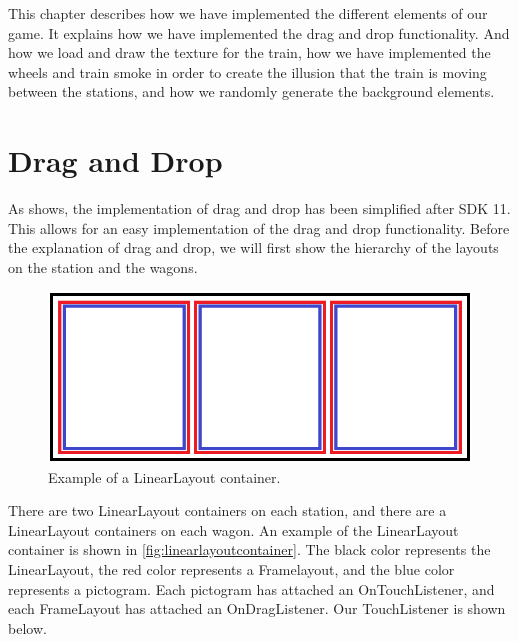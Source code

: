This chapter describes how we have implemented the different elements of our game. It explains how we have implemented the drag and drop functionality. And how we load and draw the texture for the train, how we have implemented the wheels and train smoke in order to create the illusion that the train is moving between the stations, and how we randomly generate the background elements.

\section{Drag and Drop}
\label{sec:implementationdraganddrop}
As  shows, the implementation of drag and drop has been simplified after SDK 11. This allows for an easy implementation of the drag and drop functionality. Before the explanation of drag and drop, we will first show the hierarchy of the layouts on the station and the wagons.
\begin{figure}[H]
\centering
\includegraphics[width=0.9\linewidth]{img/layoutexample.png}%
\caption{Example of a LinearLayout container.}
\label{fig:linearlayoutcontainer}
\end{figure}
There are two LinearLayout containers on each station, and there are a LinearLayout containers on each wagon. An example of the LinearLayout container is shown in \autoref{fig:linearlayoutcontainer}. The black color represents the LinearLayout, the red color represents a Framelayout, and the blue color represents a pictogram. Each pictogram has attached an OnTouchListener, and each FrameLayout has attached an OnDragListener. Our TouchListener is shown below.

